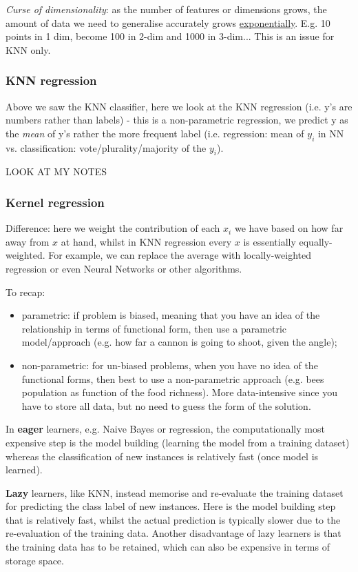 \documentclass[11pt]{article}
\begin{document}
\textit{Curse of dimensionality}: as the number of features or dimensions grows, the amount of data we need to generalise accurately grows \underline{exponentially}. E.g. 10 points in 1 dim, become 100 in 2-dim and 1000 in 3-dim... This is an issue for KNN only.

\subsubsection{KNN regression}
Above we saw the KNN classifier, here we look at the KNN regression (i.e. y's are numbers rather than labels) - this is a non-parametric regression, we predict y as the \textit{mean} of y's rather the more frequent label (i.e. regression: mean of $y_i$ in NN vs. classification: vote/plurality/majority of the $y_i$).

LOOK AT MY NOTES

\subsubsection{Kernel regression}
Difference: here we weight the contribution of each $x_i$ we have based on how far away from $x$ at hand, whilst in KNN regression every $x$ is essentially equally-weighted. For example, we can replace the average with locally-weighted regression or even Neural Networks or other algorithms.

To recap:
\begin{itemize}
	\item parametric: if problem is biased, meaning that you have an idea of the relationship in terms of functional form, then use a parametric model/approach (e.g. how far a cannon is going to shoot, given the angle);
	\item non-parametric: for un-biased problems, when you have no idea of the functional forms, then best to use a non-parametric approach (e.g. bees population as function of the food richness). More data-intensive since you have to store all data, but no need to guess the form of the solution.
\end{itemize}


In \textbf{eager} learners, e.g. Naive Bayes or regression, the computationally most expensive step is the model building (learning the model from a training dataset) whereas the classification of new instances is relatively fast (once model is learned).

\textbf{Lazy} learners, like KNN, instead memorise and re-evaluate the training dataset for predicting the class label of new instances. Here is the model building step that is relatively fast, whilst the actual prediction is typically slower due to the re-evaluation of the training data. Another disadvantage of lazy learners is that the training data has to be retained, which can also be expensive in terms of storage space.
\end{document}
